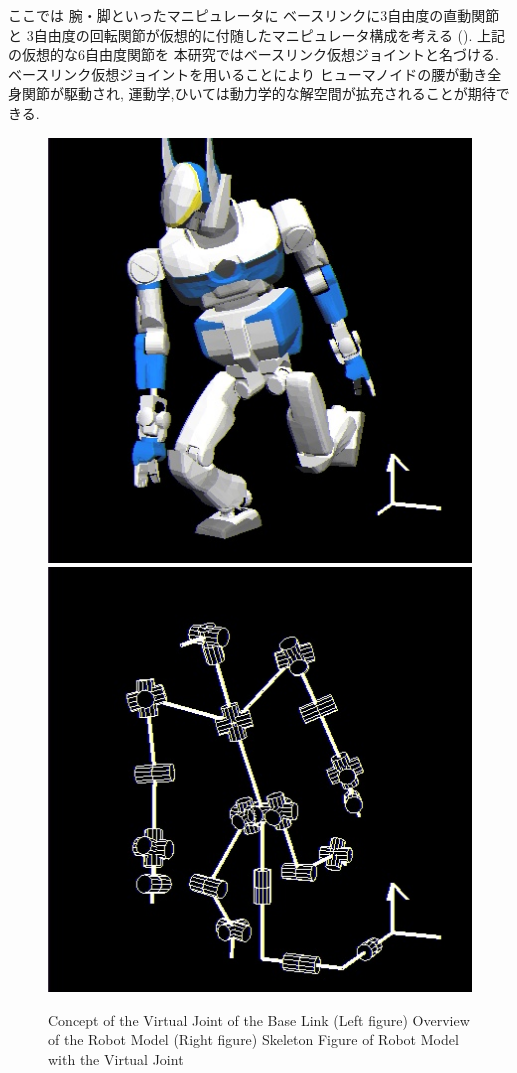 ここでは
腕・脚といったマニピュレータに
ベースリンクに3自由度の直動関節と
3自由度の回転関節が仮想的に付随したマニピュレータ構成を考える
().
上記の仮想的な6自由度関節を
本研究ではベースリンク仮想ジョイントと名づける.
ベースリンク仮想ジョイントを用いることにより
ヒューマノイドの腰が動き全身関節が駆動され,
運動学,ひいては動力学的な解空間が拡充されることが期待できる.
\begin{figure}[htb]
  \begin{center}
    \includegraphics[width=0.49\columnwidth]{fig/6dof-manip-glview.jpg}
    \includegraphics[width=0.49\columnwidth]{fig/6dof-manip-skelton.jpg}
    \caption{Concept of the Virtual Joint of the Base Link\newline
      (Left figure) Overview of the Robot Model\newline
      (Right figure) Skeleton Figure of Robot Model with the Virtual Joint
    }
  \end{center}
\end{figure}



